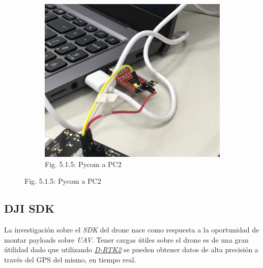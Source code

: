 \documentclass[12pt]{article}
\begin{document}
\begin{figure}[ht]
\begin{subfigure}[c]{0.45\linewidth}
    \includegraphics[width=\linewidth]{images/SMT32-PyCom-3.png}
    \caption{Fig. 5.1.5: Pycom a PC2}
  \end{subfigure}
\end{figure}

\subsection{DJI SDK}
La investigación sobre el \textit{SDK} del drone nace como respuesta a la oportunidad de montar payloads sobre \textit{UAV}. Tener cargas útiles sobre el drone es de una gran útilidad dado que utilizando \href{https://www.dji.com/d-rtk-2}{\textit{D-RTK2}} se pueden obtener datos de alta precisión a través del GPS del mismo, en tiempo real.
\end{document}
